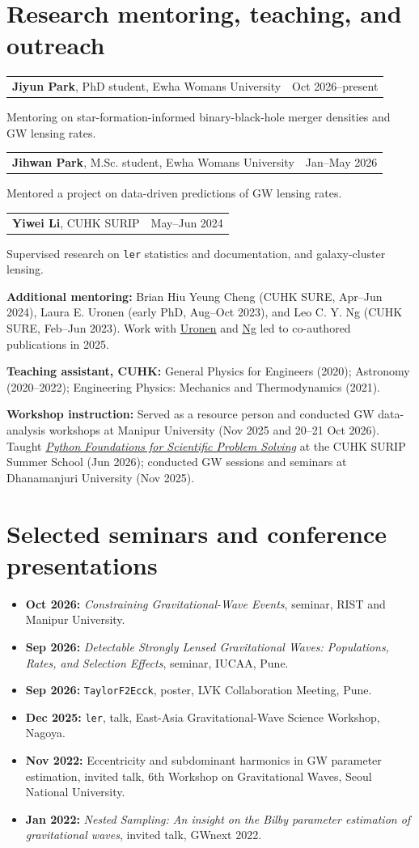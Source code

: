 \documentclass[11pt]{article}
\makeatletter
\newcommand{\dated}[2]{\par\noindent\begin{tabularx}{\linewidth}{@{}X r@{}}#1&#2\end{tabularx}\par}
\makeatother
\begin{document}
\section*{Research mentoring, teaching, and outreach}
\dated{\textbf{Jiyun Park}, PhD student, Ewha Womans University}{Oct 2026--present}
Mentoring on star-formation-informed binary-black-hole merger densities and GW lensing rates.
\dated{\textbf{Jihwan Park}, M.Sc. student, Ewha Womans University}{Jan--May 2026}
Mentored a project on data-driven predictions of GW lensing rates.
\dated{\textbf{Yiwei Li}, CUHK SURIP}{May--Jun 2024}
Supervised research on \texttt{ler} statistics and documentation, and galaxy-cluster lensing.

\textbf{Additional mentoring:} Brian Hiu Yeung Cheng (CUHK SURE, Apr--Jun 2024), Laura E. Uronen (early PhD, Aug--Oct 2023), and Leo C. Y. Ng (CUHK SURE, Feb--Jun 2023). Work with \href{https://arxiv.org/abs/2406.14257}{Uronen} and \href{https://arxiv.org/abs/2403.16532}{Ng} led to co-authored publications in 2025.

\textbf{Teaching assistant, CUHK:} General Physics for Engineers (2020); Astronomy (2020--2022); Engineering Physics: Mechanics and Thermodynamics (2021).

\textbf{Workshop instruction:} Served as a resource person and conducted GW data-analysis workshops at Manipur University (Nov 2025 and 20--21 Oct 2026). Taught \href{https://gw.phy.cuhk.edu.hk/activities/surip-summer-school-2026/}{\textit{Python Foundations for Scientific Problem Solving}} at the CUHK SURIP Summer School (Jun 2026); conducted GW sessions and seminars at Dhanamanjuri University (Nov 2025).
\section*{Selected seminars and conference presentations}
\begin{itemize}
\item \textbf{Oct 2026:} \textit{Constraining Gravitational-Wave Events}, seminar, RIST and Manipur University.
\item \textbf{Sep 2026:} \textit{Detectable Strongly Lensed Gravitational Waves: Populations, Rates, and Selection Effects}, seminar, IUCAA, Pune.
\item \textbf{Sep 2026:} \texttt{TaylorF2Ecck}, poster, LVK Collaboration Meeting, Pune.
\item \textbf{Dec 2025:} \texttt{ler}, talk, East-Asia Gravitational-Wave Science Workshop, Nagoya.
\item \textbf{Nov 2022:} Eccentricity and subdominant harmonics in GW parameter estimation, invited talk, 6th Workshop on Gravitational Waves, Seoul National University.
\item \textbf{Jan 2022:} \textit{Nested Sampling: An insight on the Bilby parameter estimation of gravitational waves}, invited talk, GWnext 2022.
\end{itemize}
\end{document}
